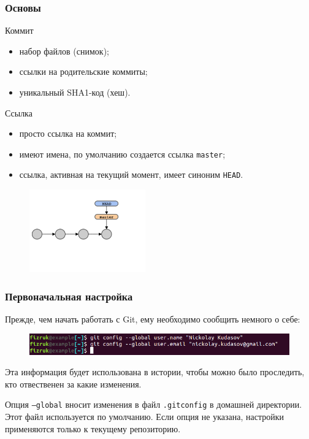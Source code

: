 \documentclass{beamer}
\begin{document}
\begin{frame}
  \frametitle{Основы}
  \begin{block}{Коммит}
    \begin{itemize}
      \item набор файлов (снимок);
      \item ссылки на родительские коммиты;
      \item уникальный SHA1-код (хеш).
    \end{itemize}
  \end{block}

  \begin{block}{Ссылка}
    \begin{itemize}
      \item просто ссылка на коммит;
      \item имеют имена, по умолчанию создается ссылка \texttt{master};
      \item ссылка, активная на текущий момент, имеет синоним \texttt{HEAD}.
    \end{itemize}
  \end{block}

  \begin{figure}
     \includegraphics[width=5cm]{images/git-simple-repo.png}
  \end{figure}
\end{frame}

\begin{frame}
  \frametitle{Первоначальная настройка}
  Прежде, чем начать работать с Git, ему необходимо сообщить немного о себе:

  \begin{figure}
     \includegraphics[width=12cm]{images/git-config.png}
  \end{figure}

  Эта информация будет использована в истории, чтобы можно было проследить,
  кто отвественен за какие изменения.

  Опция \texttt{--global} вносит изменения в файл \texttt{.gitconfig} в
  домашней директории. Этот файл используется по умолчанию. Если опция
  не указана, настройки применяются только к текущему репозиторию.
\end{frame}
\end{document}
